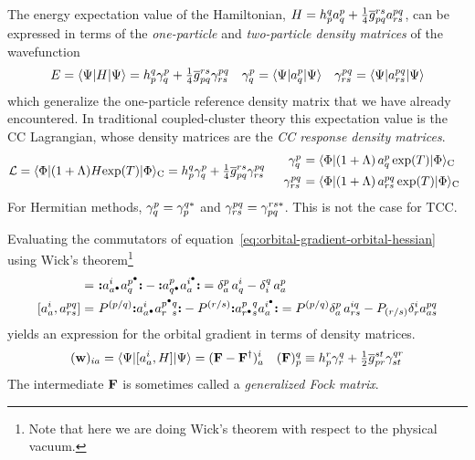 \documentclass[11pt]{article}
\numberwithin{equation}{section}
\begin{document}
\begin{dfn}
The energy expectation value of the Hamiltonian,
$
  H
=
  h_p^q
  a^p_q
+
  \tfrac{1}{4}
  \overline{g}_{pq}^{rs}
  a^{pq}_{rs}
$,
can be expressed in terms of the \textit{one-particle} and \textit{two-particle density matrices} of the wavefunction
\begin{align}
\label{eq:one-and-two-particle-density-matrices}
  E
=
  \langle\Psi |H|\Psi \rangle
=
  h_p^q
  \gamma ^p_q
+
  \tfrac{1}{4}
  \overline{g}_{pq}^{rs}
  \gamma ^{pq}_{rs}
&&
  \gamma ^p_q
=
  \langle\Psi |a^p_q|\Psi \rangle
&&
  \gamma ^{pq}_{rs}
=
  \langle\Psi |a^{pq}_{rs}|\Psi \rangle
\end{align}
which generalize the one-particle reference density matrix that we have already encountered.
In traditional coupled-cluster theory this expectation value is the CC Lagrangian, whose density matrices are the \textit{CC response density matrices}.
\begin{align}
  \mc{L}
=
  \ip{\F|(1+\La)H\mr{exp}(T)|\F}_\mr{C}
=
  h_p^q
  \g^p_q
+
  \tfr{1}{4}
  \ol{g}_{pq}^{rs}
  \g^{pq}_{rs}
&&
\begin{array}{r@{\ }l}
  \g^p_q
&=
  \ip{\F|(1 + \La)\, a^p_q\,\mr{exp}(T)|\F}_\mr{C}
\\[5pt]
  \g^{pq}_{rs}
&=
  \ip{\F|(1 + \La)\, a^{pq}_{rs}\,\mr{exp}(T)|\F}_\mr{C}
\end{array}
\end{align} 
For Hermitian methods, $\gamma ^p_q=\gamma ^{q*}_{p}$ and $\gamma ^{pq}_{rs}=\gamma ^{rs*}_{pq}$.
This is not the case for TCC.
\end{dfn}


\begin{rmk}
Evaluating the commutators of equation~\ref{eq:orbital-gradient-orbital-hessian} using Wick's theorem\footnote{
  Note that here we are doing Wick's theorem with respect to the physical vacuum.
}
\begin{align}
  [a_a^i, a^p_q]
=&\
  \no{
    a^i_{a^\ptcl}
    a^{p^\ptcl}_q
  }
-
  \no{
    a^p_{q^\ptcl}
    a^{i^\ptcl}_a
  }
=
  \d^p_a\,
  a^i_q
-
  \d^q_i\,
  a^p_a
\\
  [a_a^i, a^{pq}_{rs}]
=&\
  P^{(p/q)}
  \no{
    a^i_{a^\ptcl}
    a^{p^\ptcl q}_{r^{\phantom\ptcl}s}
  }
-
  P^{(r/s)}
  \no{
    a^{p^{\phantom\ptcl}q}_{r^\ptcl s}
    a^{i^\ptcl}_a
  }
=
  P^{(p/q)}
  \d^p_a\,
  a^{iq}_{rs}
-
  P_{(r/s)}
  \d^i_r
  a^{pq}_{as}
\end{align}
yields an expression for the orbital gradient in terms of density matrices.
\begin{align}
  (\mathbf{w})_{ia}
=
  \langle\Psi |[a_a^i, H]|\Psi \rangle
=
  (
    \mathbf{F}
  -
    \mathbf{F}^\dagger
  )_a^i
&&
  (\mathbf{F})_p^q
\equiv
  h_p^r
  \gamma ^q_r
+
  \tfrac{1}{2}
  \overline{g}_{pr}^{st}
  \gamma ^{qr}_{st}
\end{align}
The intermediate $\mathbf{F}$ is sometimes called a \textit{generalized Fock matrix}.
\end{rmk}
\end{document}

